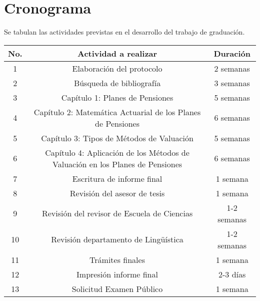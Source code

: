 \documentclass[12pt,letterpaper,titlepage]{article}
\begin{document}
\newpage

\section{Cronograma}
Se tabulan las actividades previstas en el desarrollo del trabajo de graduación.

\vspace{1cm}

\begin{tabular}{|c|c|c|}
  \hline
   \textbf{No.}  &  \textbf{Actividad a realizar} &  \textbf{Duración }\\ \hline
  1  & Elaboración del protocolo & 2 semanas \\
  2  & Búsqueda de bibliografía & 3 semanas \\
  3  & Capítulo 1: Planes de Pensiones  & 5 semanas \\
  4  & Capítulo 2: Matemática Actuarial de los Planes de Pensiones & 6 semanas \\
  5  & Capítulo 3: Tipos de Métodos de Valuación & 5 semanas \\
  6  & Capítulo 4: Aplicación de los Métodos de Valuación en los Planes de Pensiones & 6 semanas \\
  7  & Escritura de informe final & 1 semana \\
  8  & Revisión del asesor de tesis & 1 semana \\
  9 & Revisión del revisor de Escuela de Ciencias & 1-2 semanas \\
  10 & Revisión departamento de Lingüística & 1-2 semanas \\
  11 & Trámites finales & 1 semana  \\
  12 & Impresión informe final & 2-3 días \\
  13 & Solicitud Examen Público & 1 semana \\
  \hline
\end{tabular}

\newpage
\end{document}
